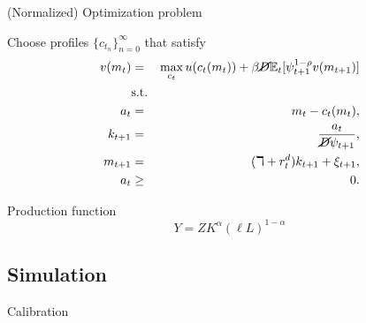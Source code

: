 \documentclass{beamer}
\begin{document}
\footnotesize
\begin{frame}{(Normalized) Optimization problem}

Choose profiles $\{c_{t_n}\}_{n=0}^{\infty}$ that satisfy
 \begin{eqnarray*}
  v(m_t) &=& \max_{c_t} u(c_t(m_t)) + \beta \cancel{D} \mathbb{E}_{t}[\psi_{t+1}^{1-\rho}v(m_{t+1})] \\
  &\text{s.t.}& \\
  a_t &=& m_t - c_t(m_t), \\
  k_{t+1} &=& \frac{a_t}{\cancel{D}\psi_{t+1}}, \\
  m_{t+1} &=& (\daleth + r^d_t)k_{t+1} + \xi_{t+1}, \\
  a_t &\geq& 0.
\end{eqnarray*}

Production function $$Y = Z K^{\alpha} (\ell L)^{1-\alpha}$$

\end{frame}

\subsection{Simulation}

\begin{frame}{Calibration}
\vfill
\begin{table}
  \centering
  \scriptsize  %
  
\end{table}
\vfill
\end{frame}


\end{document}
